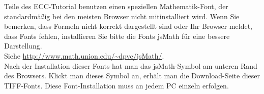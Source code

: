 \begin{refsegment}
{%



  \noindent\hangindent=6pt\makebox[6pt][l]{-}%
  Teile des ECC-Tutorial benutzen einen speziellen Mathematik-Font, der standardmäßig
  bei den meisten Browser nicht mitinstalliert wird. Wenn Sie bemerken, dass Formeln
  nicht korrekt dargestellt sind oder Ihr Browser meldet, dass Fonts fehlen,
  installieren Sie bitte die Fonts jsMath für eine bessere Darstellung.\\
  Siehe \url{http://www.math.union.edu/~dpvc/jsMath/}.\\
  Nach der Installation dieser Fonts hat man das jsMath-Symbol am unteren Rand
  des Browsers. Klickt man dieses Symbol an, erhält man die Download-Seite dieser
  TIFF-Fonts. Diese Font-Installation muss an jedem PC einzeln erfolgen.
%

}
\end{refsegment}
